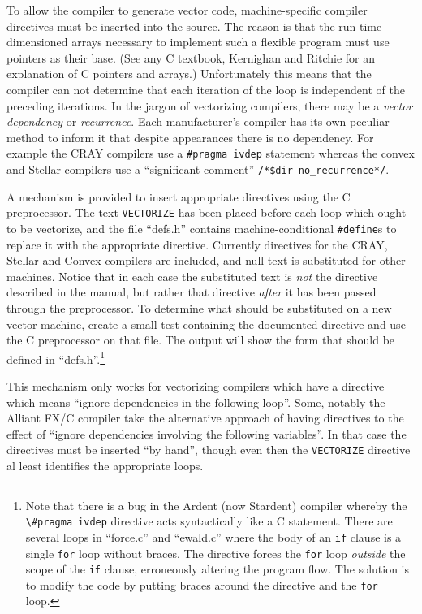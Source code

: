 To  allow  the compiler  to  generate   vector code,  machine-specific
compiler  directives must be inserted  into the  source. The reason is
that the  run-time  dimensioned arrays necessary   to implement such a
flexible  program   must use   pointers as  their  base.    (See any C
textbook, \eg    Kernighan  and  Ritchie\cite{kernighan:78}    for  an
explanation of C pointers  and arrays.)  Unfortunately this means that
the  compiler  can not determine  that each iteration  of  the loop is
independent of the preceding iterations.  In the jargon of vectorizing
compilers, there may be a {\em vector dependency\/} or {\em recurrence}.
Each manufacturer's compiler has its own  peculiar method to inform it
that despite appearances there is no dependency.  For example the CRAY
compilers use  a  \verb'#pragma'~\verb'ivdep'   statement  whereas the
convex and Stellar compilers use a ``significant comment''
\verb'/*$dir'~\verb'no_recurrence*/'.


A mechanism is provided to insert appropriate directives using the C
preprocessor.  The text \verb'VECTORIZE' has been placed before each
loop which ought to be vectorize, and the file ``defs.h'' contains
machine-conditional \verb'#define's to replace it with the appropriate
directive.  Currently directives for the CRAY, Stellar and Convex
compilers are included, and null text is substituted for other
machines.  Notice that in each case the substituted text is {\em not\/}
the directive described in the manual, but rather that directive {\em
after\/} it has been passed through the preprocessor. To determine what
should be substituted on a new vector machine, create a small test
containing the documented directive and use the C preprocessor on that
file. The output will show the form that should be defined in
``defs.h''.\footnote{Note that there is a bug in the Ardent (now
Stardent) compiler whereby the \verb'\#pragma'~\verb'ivdep' directive acts
syntactically like a C statement.  There are several loops in
``force.c'' and ``ewald.c'' where the body of an \verb'if' clause is a
single \verb'for' loop without braces.  The directive forces the
\verb'for' loop {\em outside\/} the scope of the \verb'if' clause,
erroneously altering the program flow.  The solution is to modify the
code by putting braces around the directive and the \verb'for' loop.}

This mechanism only works for vectorizing compilers which have a
directive which means ``ignore dependencies in the following loop''.
Some, notably the Alliant FX/C compiler take the alternative approach
of having directives to the effect of ``ignore dependencies involving
the following variables''.  In that case the directives must be
inserted ``by hand'', though even then the \verb'VECTORIZE' directive
al least identifies the appropriate loops.

